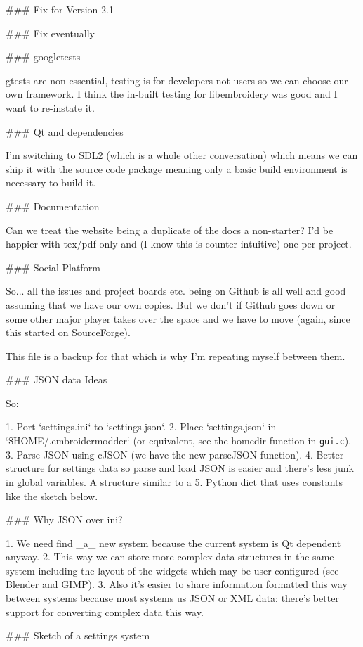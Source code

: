 ### Fix for Version 2.1

### Fix eventually

### googletests

gtests are non-essential, testing is for developers not users so we can
choose our own framework. I think the in-built testing for libembroidery
was good and I want to re-instate it.

### Qt and dependencies

I'm switching to SDL2 (which is a whole other conversation) which means
we can ship it with the source code package meaning only a basic build
environment is necessary to build it.

### Documentation

Can we treat the website being a duplicate of the docs a non-starter?
I'd be happier with tex/pdf only and (I know this is counter-intuitive)
one per project.

### Social Platform

So... all the issues and project boards etc. being on Github is all well and good assuming that we have our own copies. But we don't if Github goes down or some other major player takes over the space and we have to move (again, since this started on SourceForge).

This file is a backup for that which is why I'm repeating myself between them.

### JSON data Ideas

So:

1. Port `settings.ini` to `settings.json`.
2. Place `settings.json` in `\$HOME/.embroidermodder` (or equivalent, see the homedir function in \texttt{gui.c}).
3. Parse JSON using cJSON (we have the new parseJSON function).
4. Better structure for settings data so parse and load JSON is easier and
   there's less junk in global variables. A structure similar to a
5. Python dict that uses constants like the sketch below.

### Why JSON over ini?

1. We need find _a_ new system because the current system is Qt dependent anyway.
2. This way we can store more complex data structures in the same system including the layout of the widgets which may be user configured (see Blender and GIMP).
3. Also it's easier to share information formatted this way between systems because most systems us JSON or XML data: there's better support for converting complex data this way.

### Sketch of a settings system

